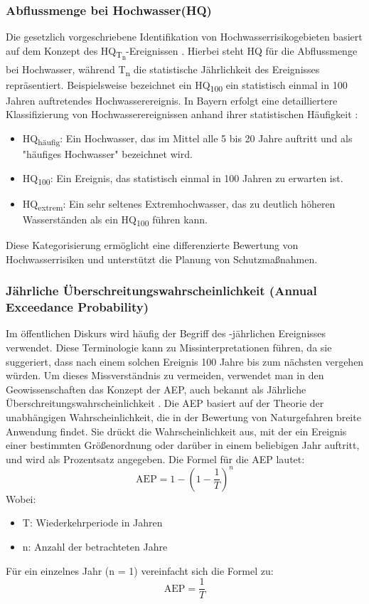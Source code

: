 \subsubsection{Abflussmenge bei Hochwasser(HQ)}\label{sec:HQ}
Die gesetzlich vorgeschriebene Identifikation von Hochwasserrisikogebieten basiert auf dem Konzept des HQ\textsubscript{T\textsubscript{n}}-Ereignissen \autocite{WHG73}. Hierbei steht HQ für die Abflussmenge bei Hochwasser, während T\textsubscript{n} die statistische Jährlichkeit des Ereignisses repräsentiert. Beispielsweise bezeichnet ein HQ\textsubscript{100} ein statistisch einmal in 100 Jahren auftretendes Hochwasserereignis.
In Bayern erfolgt eine detailliertere Klassifizierung von Hochwasserereignissen anhand ihrer statistischen Häufigkeit \autocite{BayLfU2019}:
\begin{itemize}
\item HQ\textsubscript{häufig}: Ein Hochwasser, das im Mittel alle 5 bis 20 Jahre auftritt und als "häufiges Hochwasser" bezeichnet wird.
\item HQ\textsubscript{100}: Ein Ereignis, das statistisch einmal in 100 Jahren zu erwarten ist.
\item HQ\textsubscript{extrem}: Ein sehr seltenes Extremhochwasser, das zu deutlich höheren Wasserständen als ein HQ\textsubscript{100} führen kann.
\end{itemize}
Diese Kategorisierung ermöglicht eine differenzierte Bewertung von Hochwasserrisiken und unterstützt die Planung von Schutzmaßnahmen.
\subsubsection{Jährliche Überschreitungswahrscheinlichkeit (Annual Exceedance Probability)}
Im öffentlichen Diskurs wird häufig der Begriff des -jährlichen Ereignisses\grqq{} verwendet. Diese Terminologie kann zu Missinterpretationen führen, da sie suggeriert, dass nach einem solchen Ereignis 100 Jahre bis zum nächsten vergehen würden. Um dieses Missverständnis zu vermeiden, verwendet man in den Geowissenschaften das Konzept der \ac{AEP}, auch bekannt als Jährliche Überschreitungswahrscheinlichkeit \parencite{uswrc1981} .
Die \ac{AEP} basiert auf der Theorie der unabhängigen Wahrscheinlichkeit, die in der Bewertung von Naturgefahren breite Anwendung findet. Sie drückt die Wahrscheinlichkeit aus, mit der ein Ereignis einer bestimmten Größenordnung oder darüber in einem beliebigen Jahr auftritt, und wird als Prozentsatz angegeben.
Die Formel für die AEP lautet:
\begin{equation*}
    \text{AEP} = 1 - \left(1 - \frac{1}{T}\right)^n
    \end{equation*}
Wobei:
\begin{itemize}
\item T: Wiederkehrperiode in Jahren
\item n: Anzahl der betrachteten Jahre
\end{itemize}
Für ein einzelnes Jahr (n = 1) vereinfacht sich die Formel zu:
\begin{equation}
    \text{AEP} = \frac{1}{T}
    \end{equation}